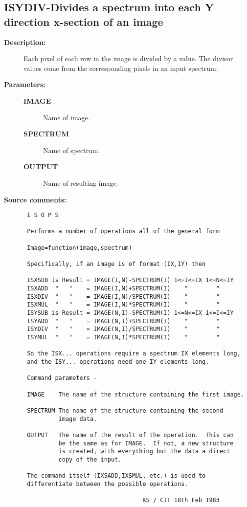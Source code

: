 \subsection{ISYDIV-\label{ISYDIV}Divides a spectrum into each Y direction x-section of an image}
\begin{description}

\item [{\bf Description:}]
 Each pixel of each row in the image is divided by a value.
 The divisor values come from the corresponding pixels in an
 input spectrum.

\item [{\bf Parameters:}]
\begin{description}
\item [{\bf IMAGE}]
 Name of image.
\item [{\bf SPECTRUM}]
 Name of spectrum.
\item [{\bf OUTPUT}]
 Name of resulting image.
\end{description}

\item [{\bf Source comments:}]
\begin{verbatim}
 I S O P S

 Performs a number of operations all of the general form

 Image=function(image,spectrum)

 Specifically, if an image is of format (IX,IY) then

 ISXSUB is Result = IMAGE(I,N)-SPECTRUM(I) 1<=I<=IX 1<=N<=IY
 ISXADD  "   "    = IMAGE(I,N)+SPECTRUM(I)    "        "
 ISXDIV  "   "    = IMAGE(I,N)/SPECTRUM(I)    "        "
 ISXMUL  "   "    = IMAGE(I,N)*SPECTRUM(I)    "        "
 ISYSUB is Result = IMAGE(N,I)-SPECTRUM(I) 1<=N<=IX 1<=I<=IY
 ISYADD  "   "    = IMAGE(N,I)+SPECTRUM(I)    "        "
 ISYDIV  "   "    = IMAGE(N,I)/SPECTRUM(I)    "        "
 ISYMUL  "   "    = IMAGE(N,I)*SPECTRUM(I)    "        "

 So the ISX... operations require a spectrum IX elements long,
 and the ISY... operations need one IY elements long.

 Command parameters -

 IMAGE    The name of the structure containing the first image.

 SPECTRUM The name of the structure containing the second
          image data.

 OUTPUT   The name of the result of the operation.  This can
          be the same as for IMAGE.  If not, a new structure
          is created, with everything but the data a direct
          copy of the input.

 The command itself (IXSADD,IXSMUL, etc.) is used to
 differentiate between the possible operations.

                                  KS / CIT 18th Feb 1983
\end{verbatim}
\end{description}
